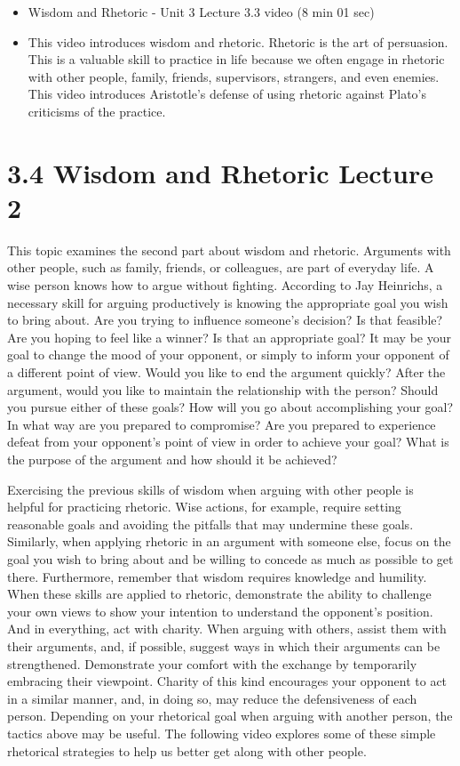 \documentclass[
]{book}
\providecommand{\tightlist}{%
  \setlength{\itemsep}{0pt}\setlength{\parskip}{0pt}}
\begin{document}
\begin{itemize}
\tightlist
\item
  Wisdom and Rhetoric - Unit 3 Lecture 3.3 video (8 min 01 sec)
\item
  This video introduces wisdom and rhetoric. Rhetoric is the art of persuasion. This is a valuable skill to practice in life because we often engage in rhetoric with other people, family, friends, supervisors, strangers, and even enemies. This video introduces Aristotle's defense of using rhetoric against Plato's criticisms of the practice.
\end{itemize}

\hypertarget{wisdom-and-rhetoric-lecture-2}{%
\section*{3.4 Wisdom and Rhetoric Lecture 2}\label{wisdom-and-rhetoric-lecture-2}}

This topic examines the second part about wisdom and rhetoric. Arguments with other people, such as family, friends, or colleagues, are part of everyday life. A wise person knows how to argue without fighting. According to Jay Heinrichs, a necessary skill for arguing productively is knowing the appropriate goal you wish to bring about. Are you trying to influence someone's decision? Is that feasible? Are you hoping to feel like a winner? Is that an appropriate goal? It may be your goal to change the mood of your opponent, or simply to inform your opponent of a different point of view. Would you like to end the argument quickly? After the argument, would you like to maintain the relationship with the person? Should you pursue either of these goals? How will you go about accomplishing your goal? In what way are you prepared to compromise? Are you prepared to experience defeat from your opponent's point of view in order to achieve your goal? What is the purpose of the argument and how should it be achieved?

Exercising the previous skills of wisdom when arguing with other people is helpful for practicing rhetoric. Wise actions, for example, require setting reasonable goals and avoiding the pitfalls that may undermine these goals. Similarly, when applying rhetoric in an argument with someone else, focus on the goal you wish to bring about and be willing to concede as much as possible to get there. Furthermore, remember that wisdom requires knowledge and humility. When these skills are applied to rhetoric, demonstrate the ability to challenge your own views to show your intention to understand the opponent's position. And in everything, act with charity. When arguing with others, assist them with their arguments, and, if possible, suggest ways in which their arguments can be strengthened. Demonstrate your comfort with the exchange by temporarily embracing their viewpoint. Charity of this kind encourages your opponent to act in a similar manner, and, in doing so, may reduce the defensiveness of each person. Depending on your rhetorical goal when arguing with another person, the tactics above may be useful. The following video explores some of these simple rhetorical strategies to help us better get along with other people.
\end{document}
